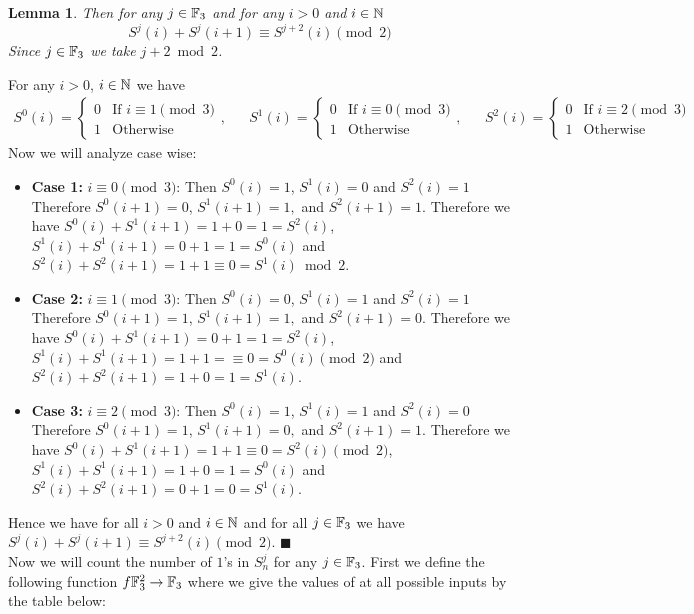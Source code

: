 \documentclass[a4paper, 11pt]{article}
\newtheorem{lemma}{Lemma}
\renewenvironment{proof}{\noindent{\it \textbf{Proof:}}\hspace*{1em}}{\hfill $\blacksquare$\bigskip\\}
\begin{document}
{\begin{lemma}\label{p3lm2}
Then for any $j\in\mathbb{F}_3$ and for any $i>0$ and $i\in\mathbb{N}$ $$S^j(i)+S^j(i+1)\equiv S^{j+2}(i)\pmod 2$$Since $j\in\mathbb{F}_3$ we take $j+2\bmod 2$. 
\end{lemma}
\begin{proof}
	For any $i>0$, $i\in\mathbb{N}$ we have  \begin{align*}
		S^0(i)=\begin{cases}
			0 & \text{If $i\equiv 1\pmod 3$}\\
			1 & \text{Otherwise}
		\end{cases}, && S^1(i)=\begin{cases}
		0 & \text{If $i\equiv 0\pmod 3$}\\
		1 & \text{Otherwise}
	\end{cases}, &&S^2(i)=\begin{cases}
	0 & \text{If $i\equiv 2\pmod 3$}\\
	1 & \text{Otherwise}
\end{cases} 
	\end{align*}
Now we will analyze case wise:\begin{itemize}
	\item \textbf{Case 1:} $i\equiv 0\pmod 3$: Then $S^0(i)=1$, $ S^1(i)=0$ and $ S^{2}(i)=1$ Therefore $S^0(i+1)=0$, $S^1(i+1)=1,$ and $ S^{2}(i+1)=1$. Therefore we have $S^0(i)+S^1(i+1)=1+0=1=S^2(i)$, $S^1(i)+S^1(i+1)=0+1=1=S^0(i)$ and $S^2(i)+S^2(i+1)=1+1\equiv 0=S^1(i)\bmod 2$.
	\item \textbf{Case 2:} $i\equiv 1\pmod 3$: Then $S^0(i)=0$, $ S^1(i)=1$ and $ S^{2}(i)=1$ Therefore $S^0(i+1)=1$, $S^1(i+1)=1,$ and $ S^{2}(i+1)=0$. Therefore we have $S^0(i)+S^1(i+1)=0+1=1=S^2(i)$, $S^1(i)+S^1(i+1)=1+1=\equiv 0=S^0(i)\pmod 2$ and $S^2(i)+S^2(i+1)=1+0=1=S^1(i)$.
	\item \textbf{Case 3:} $i\equiv 2\pmod 3$: Then $S^0(i)=1$, $ S^1(i)=1$ and $ S^{2}(i)=0$ Therefore $S^0(i+1)=1$, $S^1(i+1)=0,$ and $ S^{2}(i+1)=1$. Therefore we have $S^0(i)+S^1(i+1)=1+1\equiv 0=S^2(i)\pmod 2$, $S^1(i)+S^1(i+1)=1+0=1=S^0(i)$ and $S^2(i)+S^2(i+1)=0+1= 0=S^1(i)$.
\end{itemize}Hence we have for all $i>0$ and $i\in\mathbb{N}$ and for all $j\in\mathbb{F}_3$ we have $S^j(i)+S^j(i+1)\equiv S^{j+2}(i)\pmod 2$. 
\end{proof}Now we will count the number of $1$'s in $S^j_n$ for any $j\in\mathbb{F}_3$. First we define the following function $f\mathbb{F}_3^2\to\mathbb{F}_3$ where we give the values of at all possible inputs by the table below:

}
\end{document}
